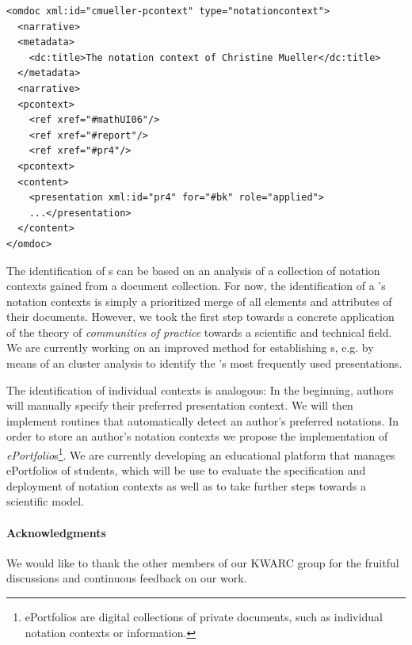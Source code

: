 \documentclass[a4paper]{article}
\begin{document}
\begin{lstlisting}[mathescape,numbers=none]
<omdoc xml:id="cmueller-pcontext" type="notationcontext">
  <narrative>
  <metadata>
    <dc:title>The notation context of Christine Mueller</dc:title>
  </metadata>
  <narrative>
  <pcontext>
    <ref xref="#mathUI06"/>
    <ref xref="#report"/>
    <ref xref="#pr4"/>
  <pcontext>
  <content>
    <presentation xml:id="pr4" for="#bk" role="applied">
    ...</presentation>
  </content>
</omdoc>
\end{lstlisting}

The identification of {\cop}s can be based on an analysis of a collection of notation
contexts gained from a document collection. For now, the identification of a {\cop}'s
notation contexts is simply a prioritized merge of all {} elements and
{} attributes of their documents. However, we took the first step towards
a concrete application of the theory of {\emph{communities of practice}} towards a
scientific and technical field. We are currently working on an improved method for
establishing {\cop}s, e.g. by means of an cluster analysis to identify the {\cop}'s most
frequently used presentations.

The identification of individual contexts is analogous: In the beginning, authors will
manually specify their preferred presentation context. We will then implement routines
that automatically detect an author's preferred notations. In order to store an author's
notation contexts we propose the implementation of
{\emph{ePortfolio}}s\footnote{ePortfolios are digital collections of private documents,
  such as individual notation contexts or {\cop} information.}. We are currently
developing an educational platform that manages ePortfolios of students, which will be use
to evaluate the specification and deployment of notation contexts as well as to take
further steps towards a scientific {\cop} model.

\paragraph{Acknowledgments}\label{sec:ack}
We would like to thank the other members of our KWARC group for the fruitful discussions
and continuous feedback on our work.
\newpage

\begin{footnotesize}
 

\end{footnotesize}
\end{document}
